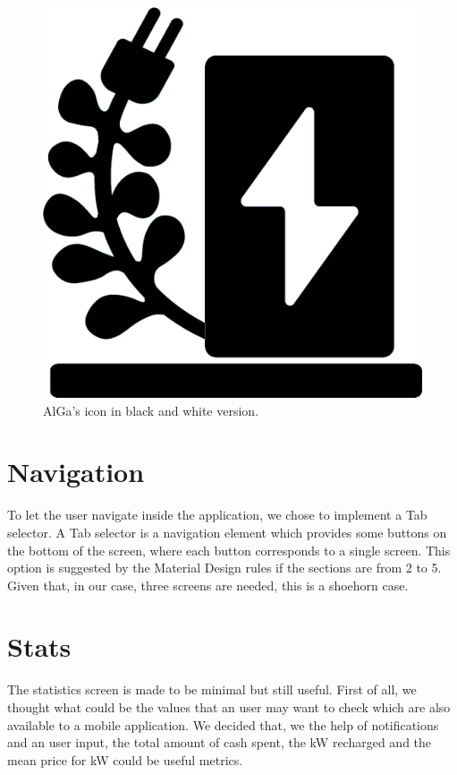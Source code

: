 \begin{figure}[H]
    \centering
    \includegraphics[scale=0.5]{Pics/icon_bw.png}
    \caption{AlGa's icon in black and white version.}
    \label{fig:icon_bw}
\end{figure}

\section{Navigation}
To let the user navigate inside the application, we chose to implement a Tab selector.
A Tab selector is a navigation element which provides some buttons on the bottom of the screen, where each button corresponds to a single screen.
This option is suggested by the Material Design rules if the sections are from 2 to 5. Given that, in our case, three screens are needed, this is a shoehorn case.

\section{Stats}
The statistics screen is made to be minimal but still useful. First of all, we thought what could be the values that an user may want to check which are also available to a mobile application.
We decided that, we the help of notifications and an user input, the total amount of cash spent, the kW recharged and the mean price for kW could be useful metrics.

